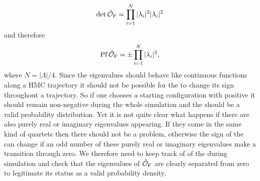 %
%
\begin{equation}
\det \hat{\mathcal{O}}_{\rm F} = \prod\limits_{i=1}^{N} \vert \lambda_{i}\vert^{2} \vert \lambda_{i} \vert^{2}
\end{equation}
%
%
and therefore
%
%
\begin{equation}
\text{Pf}\,\hat{\mathcal{O}}_{\rm F} =  \pm\prod\limits_{i=1}^{N} \vert \lambda_{i}\vert^{2},
\end{equation}
%
%
where $N=\vert \mathit{\Lambda}\vert /4$. Since the eigenvalues should behave like continuous functions along a HMC trajectory it should not be possible for the  to change its sign throughout a trajectory. So if one chooses a starting configuration with positive  it should remain non-negative during the whole simulation and the  should be a valid probability distribution. Yet it is not quite clear what happens if there are also purely real or imaginary eigenvalues appearing. If they come in the same kind of quartets then there should not be a problem, otherwise the sign of the  can change if an odd number of these purely real or imaginary eigenvalues make a transition through zero. We therefore need to keep track of of the  during simulation and check that the eigenvalues of $\hat{\mathcal{O}}_{\rm F}$ are clearly separated from zero to legitimate its status as a valid probability density.
%
%
%
%
%
%
%
%
%
%
